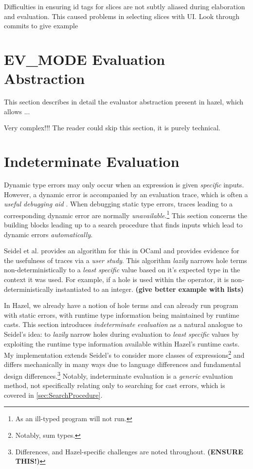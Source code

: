 Difficulties in ensuring id tags for slices are not subtly aliased during elaboration and evaluation. This caused problems in selecting slices with UI. Look through commits to give example

\section{EV\_MODE Evaluation Abstraction}
This section describes in detail the evaluator abstraction present in hazel, which allows ...

Very complex!!! The reader could skip this section, it is purely technical.

\section{Indeterminate Evaluation}\label{sec:IndetEval}
Dynamic type errors may only occur when an expression is given \textit{specific} inputs. However, a dynamic error is accompanied by an evaluation trace, which is often a \textit{useful debugging aid} \cite{TraceVisualisation}. When debugging static type errors, traces leading to a corresponding dynamic error are normally \textit{unavailable}.\footnote{As an ill-typed program will not run.} This section concerns the building blocks leading up to a search procedure that finds inputs which lead to dynamic errors \textit{automatically}.

Seidel et al. \cite{SearchProc} provides an algorithm for this in OCaml and provides evidence for the usefulness of traces via a \textit{user study}. This algorithm \textit{lazily} narrows hole terms non-deterministically to a \textit{least specific} value based on it's expected type in the context it was used. For example, if a hole is used within the \code{(+)} operator, it is non-deterministically instantiated to an integer. \textbf{(give better example with lists)}

In Hazel, we already have a notion of hole terms and can already run program with static errors, with runtime type information being maintained by runtime casts. This section introduces \textit{indeterminate evaluation} as a natural analogue to Seidel's idea: to \textit{lazily} narrow holes during evaluation to \textit{least specific} values by exploiting the runtime type information available within Hazel's runtime casts. My implementation extends Seidel's to consider more classes of expressions\footnote{Notably, sum types.} and differs mechanically in many ways due to language differences and fundamental design differences.\footnote{Differences, and Hazel-specific challenges are noted throughout. \textbf{(ENSURE THIS!)}} Notably, indeterminate evaluation is a \textit{generic} evaluation method, not specifically relating only to searching for cast errors, which is covered in \cref{sec:SearchProcedure}.


